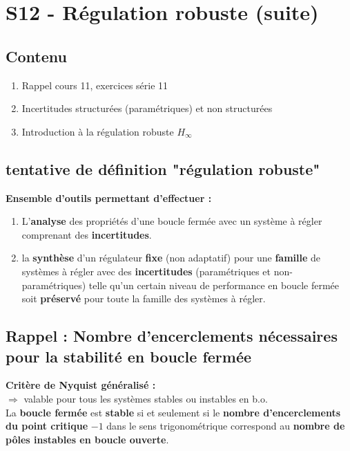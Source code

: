 \documentclass[document.tex]{subfiles}
\begin{document}
\section{S12 - Régulation robuste (suite)}

\subsection{Contenu}

\begin{enumerate}
\item Rappel cours 11, exercices série 11
\item Incertitudes structurées (paramétriques) et non structurées
\item Introduction à la régulation robuste $H_\infty$
\end{enumerate}


\subsection{tentative de définition "régulation robuste"}

\textbf{Ensemble d'outils permettant d'effectuer :}\\

\begin{enumerate}
\item L'\textbf{analyse} des propriétés d'une boucle fermée avec un système à régler comprenant des \textbf{incertitudes}.
\item la \textbf{synthèse} d'un régulateur \textbf{fixe} (non adaptatif) pour une \textbf{famille} de systèmes à régler avec des \textbf{incertitudes} (paramétriques et non-paramétriques) telle qu'un certain niveau de performance en boucle fermée soit \textbf{préservé} pour toute la famille des systèmes à régler.
\end{enumerate}

\subsection{Rappel : Nombre d'encerclements nécessaires pour la stabilité en boucle fermée}

\textbf{Critère de Nyquist généralisé : }\\

$\Rightarrow$ valable pour tous les systèmes stables ou instables en b.o.\\
La \textbf{boucle fermée} est \textbf{stable} si et seulement si le \textbf{nombre
d'encerclements du point critique} $-1$ dans le sens trigonométrique correspond au \textbf{nombre de pôles instables en boucle ouverte}.
\end{document}
